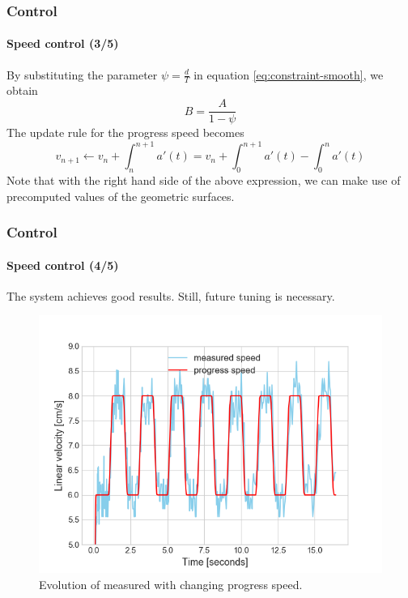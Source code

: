 \documentclass[10pt]{beamer}
\begin{document}

\begin{frame}
\frametitle{Control}
\framesubtitle{Speed control (3/5)}
By substituting the parameter $\psi = \frac{d}{T}$ in equation \ref{eq:constraint-smooth}, we obtain
$$
\boxed{B = \frac{A}{1-\psi}} 
$$
The update rule for the progress speed becomes
$$
v_{n+1} \leftarrow v_n + \int_{n}^{n+1}a'(t) = v_n + \int_{0}^{n+1}a'(t) - \int_{0}^{n}a'(t)
$$
Note that with the right hand side of the above expression, we can make use of precomputed values of the geometric surfaces.
\end{frame}


\begin{frame}
\frametitle{Control}
\framesubtitle{Speed control (4/5)}
The system achieves good results. Still, future tuning is necessary.
\begin{figure}[hbtp]
\centering
\includegraphics[scale=0.45]{figures/pid_speed_normal.png}
\caption{Evolution of measured with changing progress speed.}
\label{fig:all-cycles}
\end{figure}
\end{frame}

\end{document}
